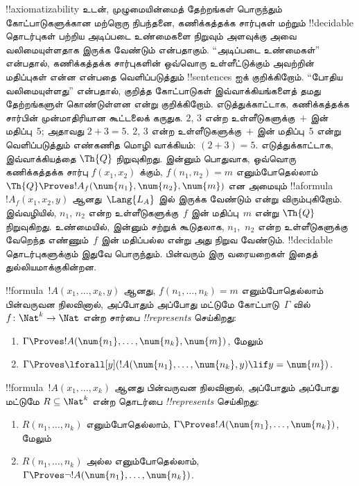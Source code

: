 \documentclass[../../../include/open-logic-section]{subfiles}
\begin{document}
!!{axiomatizability} உடன், முழுமையின்மைத் தேற்றங்கள் பொருந்தும்
கோட்பாடுகளுக்கான மற்றொரு நிபந்தனை, கணிக்கத்தக்க சார்புகள் மற்றும்
!!{decidable} தொடர்புகள் பற்றிய அடிப்படை உண்மைகளை நிறுவும் அளவுக்கு அவை
வலிமையுள்ளதாக இருக்க வேண்டும் என்பதாகும். ``அடிப்படை உண்மைகள்'' என்பதால்,
கணிக்கத்தக்க சார்புகளின் ஒவ்வொரு உள்ளீட்டுக்கும் அவற்றின் மதிப்புகள் என்ன
என்பதை வெளிப்படுத்தும் !!{sentence}s ஐக் குறிக்கிறோம். ``போதிய
வலிமையுள்ளது'' என்பதால், குறித்த கோட்பாடுகள் இவ்வாக்கியங்களைத் தமது
தேற்றங்களுள் கொண்டுள்ளன என்று குறிக்கிறோம். எடுத்துக்காட்டாக, கணிக்கத்தக்க
சார்பின் முன்மாதிரியான கூட்டலைக் கருதுக. $2$, $3$ என்ற உள்ளீடுகளுக்கு~$+$
இன் மதிப்பு~$5$; அதாவது $2+3 = 5$. $2$, $3$ என்ற உள்ளீடுகளுக்கு~$+$ இன்
மதிப்பு~$5$ என்று வெளிப்படுத்தும் எண்கணித மொழி வாக்கியம்:
$(\num{2} + \num{3}) = \num{5}$. எடுத்துக்காட்டாக, இவ்வாக்கியத்தை
$\Th{Q}$ நிறுவுகிறது. இன்னும் பொதுவாக, ஒவ்வொரு கணிக்கத்தக்க சார்பு
$f(x_1, x_2)$ க்கும், $f(n_1, n_2) = m$ எனும்போதெல்லாம்
$\Th{Q} \Proves !A_f(\num{n_1}, \num{n_2}, \num{m})$ என அமையும்
!!a{formula}~$!A_f(x_1, x_2, y)$ ஆனது~$\Lang{L_A}$ இல் இருக்க வேண்டும்
என்று விரும்புகிறோம். இவ்வழியில், $n_1$, $n_2$ என்ற உள்ளீடுகளுக்கு~$f$
இன் மதிப்பு~$m$ என்று $\Th{Q}$ நிறுவுகிறது. உண்மையில், இன்னும் சற்றுக்
கூடுதலாக, $n_1$,~$n_2$ என்ற உள்ளீடுகளுக்கு வேறெந்த எண்ணும்~$f$ இன்
மதிப்பல்ல என்று அது நிறுவ வேண்டும். !!{decidable} தொடர்புகளுக்கும் இதுவே
பொருந்தும். பின்வரும் இரு வரையறைகள் இதைத் துல்லியமாக்குகின்றன.

\begin{defn}
!!{formula}~$!A(x_1, \dots, x_k, y)$ ஆனது, $f(n_1, \dots, n_k) = m$
எனும்போதெல்லாம் பின்வருவன நிலவினால், அப்போதும் அப்போது மட்டுமே
கோட்பாடு~$\Gamma$ வில் $f\colon \Nat^k \to \Nat$ என்ற சார்பை
\emph{!!{represents}} செய்கிறது:
\begin{enumerate}
\item $\Gamma \Proves !A(\num{n_1}, \dots, \num{n_k}, \num{m})$, மேலும்
\item $\Gamma \Proves \lforall[y](!A(\num{n_1}, \dots, \num{n_k},
y) \lif y = \num{m})$.
\end{enumerate}
\end{defn}

\begin{defn}
!!{formula}~$!A(x_1, \dots, x_k)$ ஆனது பின்வருவன நிலவினால், அப்போதும்
அப்போது மட்டுமே $R \subseteq \Nat^k$ என்ற தொடர்பை
\emph{!!{represents}} செய்கிறது:
\begin{enumerate}
\item $R(n_1, \dots, n_k)$ எனும்போதெல்லாம், $\Gamma \Proves
!A(\num{n_1}, \dots, \num{n_k})$, மேலும்
\item $R(n_1, \dots, n_k)$ அல்ல எனும்போதெல்லாம், $\Gamma \Proves \lnot
!A(\num{n_1}, \dots, \num{n_k})$.
\end{enumerate}
\end{defn}
\end{document}

